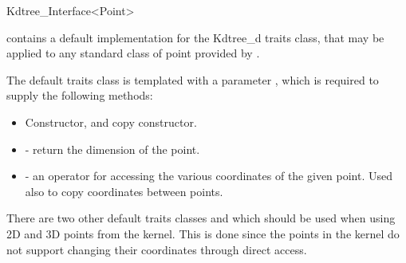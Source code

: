\begin{ccRefClass}{Kdtree_Interface<Point>}

{\cgal}  contains a default implementation for the Kdtree\_d traits
class, that
may be applied to any
standard class of point provided by \cgal.

The default traits class  is
templated with a parameter , which is required to
supply the following methods:

\begin{itemize}
    \item Constructor, and copy constructor.

    \item {} - return the dimension of the point.
    
    \item {} - an operator for accessing
    the various coordinates of the given point. Used also to copy
    coordinates between points.
\end{itemize}

There are two other default traits classes  
and  which should be used when using 
2D and 3D points from the {\cgal} kernel. This is done since the points in the
kernel do not support changing their coordinates through direct access. 

\end{ccRefClass}
